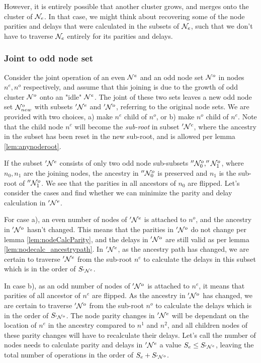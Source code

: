 However, it is entirely possible that another cluster grows, and merges onto the cluster of $\mathcal{N}_{e}$. In that case, we might think about recovering some of the node parities and delays that were calculated in the subsets of $\mathcal{N}_e$, such that we don't have to traverse $\mathcal{N}_{e}$ entirely for its parities and delays.

\subsubsection{Joint to odd node set}

Consider the joint operation of an even $\mathcal{N}^e$ and an odd node set $\mathcal{N}^o$ in nodes $n^e, n^o$ respectively, and assume that this joining is due to the growth of odd cluster $\mathcal{N}^o$ onto an "idle" $\mathcal{N}^e$. The joint of these two sets leaves a new odd node set $\mathcal{N}_{new}^o$ with subsets $'\mathcal{N}^e$ and $'\mathcal{N}^o$, referring to the original node sets. We are provided with two choices, a) make $n^e$ child of $n^o$, or b) make $n^o$ child of $n^e$. Note that the child node $n^c$ will become the \emph{sub-root} in subset $'\mathcal{N}^c$, where the ancestry in the subset has been reset in the new sub-root, and is allowed per lemma \ref{lem:anynoderoot}.

If the subset $'\mathcal{N}^e$ consists of only two odd node sub-subsets $''\mathcal{N}^o_0, ''\mathcal{N}^o_1$, where $n_0, n_1$ are the joining nodes, the ancestry in $''\mathcal{N}^o_0$ is preserved and $n_1$ is the sub-root of $''\mathcal{N}^o_1$. We see that the parities in all ancestors of $n_0$ are flipped. Let's consider the cases and find whether we can minimize the parity and delay calculation in $'\mathcal{N}^{e}$.

For case a), an even number of nodes of $'\mathcal{N}^e$ is attached to $n^o$, and the ancestry in $'\mathcal{N}^o$ hasn't changed. This means that the parities in $'\mathcal{N}^o$ do not change per lemma \ref{lem:nodeCalcParity}, and the delays in $'\mathcal{N}^o$ are still valid as per lemma \ref{lem:nodecalc_ancestrypath}. In $'\mathcal{N}^e$, as the ancestry path has changed, we are certain to traverse $'\mathcal{N}^e$ from the sub-root $n^e$ to calculate the delays in this subset which is in the order of $S_{'\mathcal{N}^e}$.

In case b), as an odd number of nodes of $'\mathcal{N}^o$ is attached to $n^e$, it means that parities of all ancestor of $n^e$ are flipped. As the ancestry in $'\mathcal{N}^{o}$ has changed, we are certain to traverse $'\mathcal{N}^o$ from the sub-root $n^o$ to calculate the delays which is in the order of $S_{'\mathcal{N}^o}$. The node parity changes in $'\mathcal{N}^e$ will be dependant on the location of $n^e$ in the ancestry compared to $n^1$ and $n^2$, and all children nodes of these parity changes will have to recalculate their delays. Let's call the number of nodes needs to calculate parity and delays in $'\mathcal{N}^e$ a value $S_e \leq S_{'\mathcal{N}^e}$, leaving the total number of operations in the order of $S_e + S_{'\mathcal{N}^o}$.

